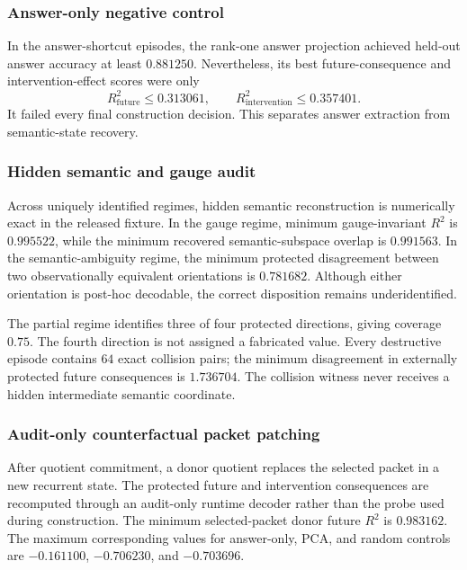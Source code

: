 \subsubsection{Answer-only negative control}

In the answer-shortcut episodes, the rank-one answer projection achieved held-out answer accuracy at least $0.881250$.  Nevertheless, its best future-consequence and intervention-effect scores were only
\begin{equation}
R^2_{\mathrm{future}}\leq0.313061,
\qquad
R^2_{\mathrm{intervention}}\leq0.357401.
\end{equation}
It failed every final construction decision.  This separates answer extraction from semantic-state recovery.

\subsubsection{Hidden semantic and gauge audit}

Across uniquely identified regimes, hidden semantic reconstruction is numerically exact in the released fixture.  In the gauge regime, minimum gauge-invariant $R^2$ is $0.995522$, while the minimum recovered semantic-subspace overlap is $0.991563$.  In the semantic-ambiguity regime, the minimum protected disagreement between two observationally equivalent orientations is $0.781682$.  Although either orientation is post-hoc decodable, the correct disposition remains underidentified.

The partial regime identifies three of four protected directions, giving coverage $0.75$.  The fourth direction is not assigned a fabricated value.  Every destructive episode contains $64$ exact collision pairs; the minimum disagreement in externally protected future consequences is $1.736704$.  The collision witness never receives a hidden intermediate semantic coordinate.

\subsubsection{Audit-only counterfactual packet patching}

After quotient commitment, a donor quotient replaces the selected packet in a new recurrent state.  The protected future and intervention consequences are recomputed through an audit-only runtime decoder rather than the probe used during construction.  The minimum selected-packet donor future $R^2$ is $0.983162$.  The maximum corresponding values for answer-only, PCA, and random controls are $-0.161100$, $-0.706230$, and $-0.703696$.


